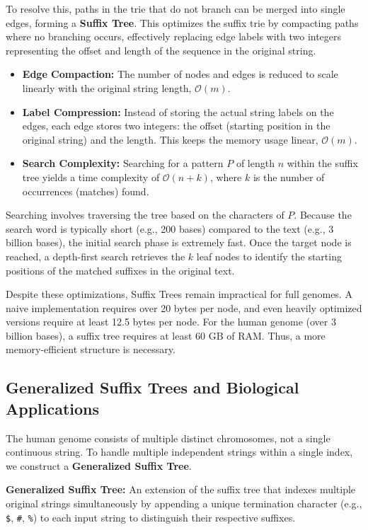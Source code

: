 To resolve this, paths in the trie that do not branch can be merged into single edges, forming a \textbf{Suffix Tree}. This optimizes the suffix trie by compacting paths where no branching occurs, effectively replacing edge labels with two integers representing the offset and length of the sequence in the original string.
\begin{itemize}
    \item \textbf{Edge Compaction:} The number of nodes and edges is reduced to scale linearly with the original string length, \( \mathcal{O}(m) \).
    \item \textbf{Label Compression:} Instead of storing the actual string labels on the edges, each edge stores two integers: the offset (starting position in the original string) and the length. This keeps the memory usage linear, \( \mathcal{O}(m) \).
    \item \textbf{Search Complexity:} Searching for a pattern \( P \) of length \( n \) within the suffix tree yields a time complexity of \( \mathcal{O}(n + k) \), where \( k \) is the number of occurrences (matches) found.
\end{itemize}

Searching involves traversing the tree based on the characters of \( P \). Because the search word is typically short (e.g., 200 bases) compared to the text (e.g., 3 billion bases), the initial search phase is extremely fast. Once the target node is reached, a depth-first search retrieves the \( k \) leaf nodes to identify the starting positions of the matched suffixes in the original text.

Despite these optimizations, Suffix Trees remain impractical for full genomes. A naive implementation requires over 20 bytes per node, and even heavily optimized versions require at least 12.5 bytes per node. For the human genome (over 3 billion bases), a suffix tree requires at least 60 GB of RAM. Thus, a more memory-efficient structure is necessary.

\subsection{Generalized Suffix Trees and Biological Applications}

The human genome consists of multiple distinct chromosomes, not a single continuous string. To handle multiple independent strings within a single index, we construct a \textbf{Generalized Suffix Tree}.

\begin{important}
    \textbf{Generalized Suffix Tree:} An extension of the suffix tree that indexes multiple original strings simultaneously by appending a unique termination character (e.g., \verb|$|, \verb|#|, \verb|%|) to each input string to distinguish their respective suffixes.
\end{important}

